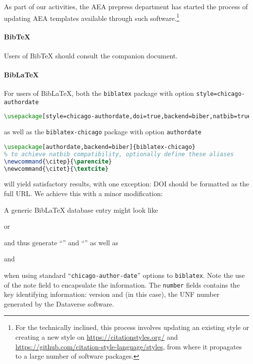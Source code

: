 \documentclass[AEJ]{AEA}
\newcommand{\citep}{\parencite}
\newcommand{\citet}{\textcite}
\begin{document}
As part of our activities, the AEA prepress department has started the process of updating AEA templates available through such software.\footnote{For the technically inclined, this process involves updating an existing style or creating a new style on \url{https://citationstyles.org/} and \url{https://github.com/citation-style-language/styles}, from where it propagates to a large number of software packages.}  

\paragraph{BibTeX}
Users of BibTeX should consult the companion document.

\paragraph{BibLaTeX}
\lstset{basicstyle=\small\ttfamily}
For users of BibLaTeX, both the \texttt{biblatex} package with option \texttt{style=chicago-authordate} 
\begin{lstlisting}[language=TeX]
\usepackage[style=chicago-authordate,doi=true,backend=biber,natbib=true]{biblatex}
\end{lstlisting}
as well as the \texttt{biblatex-chicago} package with option \texttt{authordate} 
\begin{lstlisting}[language=TeX]
\usepackage[authordate,backend=biber]{biblatex-chicago}
% to achieve natbib compatibility, optionally define these aliases
\newcommand{\citep}{\parencite}
\newcommand{\citet}{\textcite}
\end{lstlisting}
will yield satisfactory results, with one exception: \ac{DOI} should be formatted as the full URL. We achieve this with a minor modification:


A generic BibLaTeX database entry might look like
\lstset{language=}

%
or

%
and thus generate ``\citet{duflopande2006}'' and ``\citet{leiss1999}'' as well as
%
\begin{quote}
\end{quote}
%
and
%
\begin{quote}
\end{quote}
%
when using standard ``\texttt{chicago-author-date}'' options to \texttt{biblatex}. Note the use of the note field to encapsulate the information. The \texttt{number} fields contains the key identifying information: version and (in this case), the UNF number generated by the Dataverse software.
\end{document}
